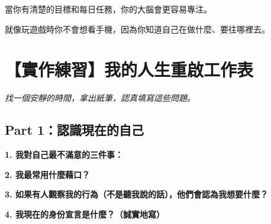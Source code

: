 \documentclass[12pt,a4paper]{article}
\begin{document}
\begin{tcolorbox}[colback=emergency_blue!5!white, colframe=emergency_blue, title=\textbf{為什麼這樣做有用？}]
當你有清楚的目標和每日任務，你的大腦會更容易專注。

就像玩遊戲時你不會想看手機，因為你知道自己在做什麼、要往哪裡去。
\end{tcolorbox}

\section{【實作練習】我的人生重啟工作表}

\textit{找一個安靜的時間，拿出紙筆，認真填寫這些問題。}

\subsection{Part 1：認識現在的自己}

\textbf{1. 我對自己最不滿意的三件事：}
\begin{center}
\end{center}

\textbf{2. 我最常用什麼藉口？}
\begin{center}
\end{center}

\textbf{3. 如果有人觀察我的行為（不是聽我說的話），他們會認為我想要什麼？}
\begin{center}
\end{center}

\textbf{4. 我現在的身份宣言是什麼？（誠實地寫）}
\begin{center}
\end{center}
\end{document}
